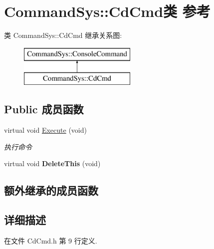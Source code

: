 \hypertarget{class_command_sys_1_1_cd_cmd}{\section{Command\-Sys\-:\-:Cd\-Cmd类 参考}
\label{class_command_sys_1_1_cd_cmd}
}
类 Command\-Sys\-:\-:Cd\-Cmd 继承关系图\-:\begin{figure}[H]
\begin{center}
\leavevmode
\includegraphics[height=2.000000cm]{class_command_sys_1_1_cd_cmd}
\end{center}
\end{figure}
\subsection*{Public 成员函数}
\begin{DoxyCompactItemize}
\item 
virtual void \hyperlink{class_command_sys_1_1_cd_cmd_af355386817b6cad86d370d65267d5d88}{Execute} (void)
\begin{DoxyCompactList}\small\item\em 执行命令 \end{DoxyCompactList}\item 
\hypertarget{class_command_sys_1_1_cd_cmd_aca0bbe917efa240c7d6a811794565177}{virtual void {\bfseries Delete\-This} (void)}\label{class_command_sys_1_1_cd_cmd_aca0bbe917efa240c7d6a811794565177}

\end{DoxyCompactItemize}
\subsection*{额外继承的成员函数}


\subsection{详细描述}


在文件 Cd\-Cmd.\-h 第 9 行定义.



